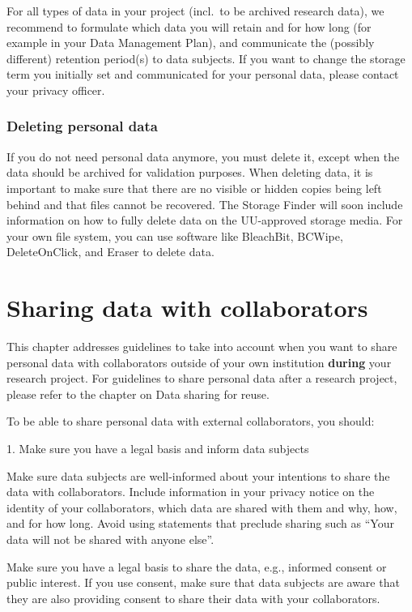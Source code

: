 \documentclass[
]{book}
\begin{document}
For all types of data in your project (incl.~to be archived research data), we
recommend to formulate which data you will retain and for how long (for example
in your Data Management Plan), and communicate the (possibly different)
retention period(s) to data subjects. If you want to change the storage term you
initially set and communicated for your personal data, please contact your
privacy officer.

\hypertarget{deleting-personal-data}{%
\subsection{Deleting personal data}\label{deleting-personal-data}}

If you do not need personal data anymore, you must delete it, except when the data
should be archived for validation purposes. When deleting data, it is important
to make sure that there are no visible or hidden copies being left behind and
that files cannot be recovered. The Storage Finder
will soon include information on how to fully delete data on the UU-approved
storage media. For your own file system, you can use software like
BleachBit,
BCWipe,
DeleteOnClick,
and Eraser to delete data.

\hypertarget{data-sharing-collaboration}{%
\chapter{Sharing data with collaborators}\label{data-sharing-collaboration}}

This chapter addresses guidelines to take into account when you want to share
personal data with collaborators outside of your own institution \textbf{during}
your research project. For guidelines to share personal data after a research
project, please refer to the chapter on
Data sharing for reuse.

To be able to share personal data with external collaborators, you should:

1. Make sure you have a legal basis and
inform data subjects

Make sure data subjects are well-informed about your intentions to
share the data with collaborators. Include information in your
privacy notice on the identity of your
collaborators, which data are shared with them and why, how, and for how
long. Avoid using statements that preclude sharing such as ``Your data
will not be shared with anyone else''.

Make sure you have a legal basis to
share the data, e.g., informed consent or public interest. If you use
consent, make sure that data subjects are aware that they are also
providing consent to share their data with your collaborators.
\end{document}
